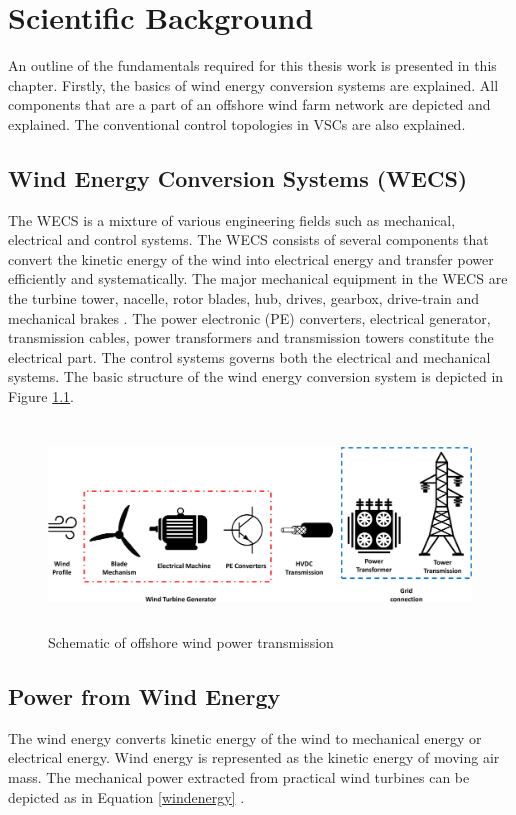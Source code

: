 \chapter{Scientific Background}\label{2}
An outline of the fundamentals required for this thesis work is presented in this chapter. Firstly, the basics of wind energy conversion systems are explained. All components that are a part of an offshore wind farm network are depicted and explained. The conventional control topologies in \gls{VSC}s are also explained.

\section{Wind Energy Conversion Systems (WECS)}\label{WECS_theory}
The \gls{WECS} is a mixture of various engineering fields such as mechanical, electrical and control systems. The \gls{WECS} consists of several components that convert the kinetic energy of the wind into electrical energy and transfer power efficiently and systematically. The major mechanical equipment in the \gls{WECS} are the turbine tower, nacelle, rotor blades, hub, drives, gearbox, drive-train and mechanical brakes \cite{manwell2010wind}. The power electronic (\gls{PE}) converters, electrical generator, transmission cables, power transformers and transmission towers constitute the electrical part. The control systems \cite{yaramasu_high-power_2015} governs both the electrical and mechanical systems.
The basic structure of the wind energy conversion system is depicted in Figure \ref{fig:WECS}.   

\begin{figure}[H]
\centering
    \includegraphics[height = 5.5cm,width = 15.5cm]{Diagrams/Chapter_2/WECS.pdf}
    \caption{Schematic of offshore wind power transmission}
    \label{fig:WECS}
\end{figure}

\section{Power from Wind Energy} 
The wind energy converts kinetic energy of the wind to mechanical energy or electrical energy. Wind energy is represented as the kinetic energy of moving air mass. The mechanical power extracted from practical wind turbines can be depicted as in Equation \ref{windenergy} \cite{ali_wind_2012}.


